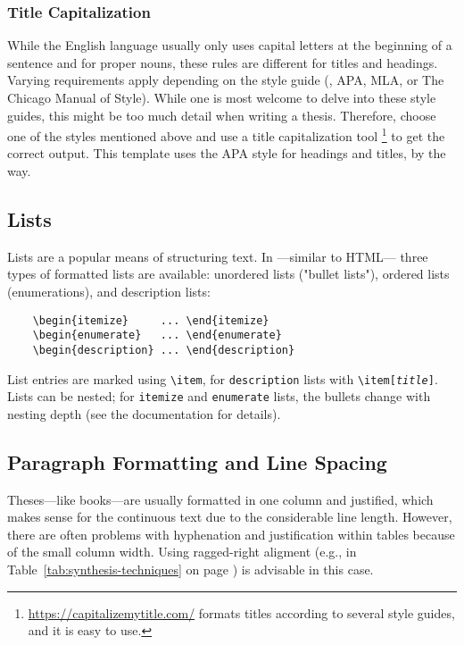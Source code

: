 \subsubsection{Title Capitalization}

While the English language usually only uses capital letters at the beginning of
a sentence and for proper nouns, these rules are different for titles and
headings. Varying requirements apply depending on the style guide (\eg, APA,
MLA, or The Chicago Manual of Style). While one is most welcome to delve into
these style guides, this might be too much detail when writing a thesis.
Therefore, choose one of the styles mentioned above and use a
title capitalization tool%
\footnote{\url{https://capitalizemytitle.com/} formats titles according to
several style guides, and it is easy to use.}
to get the correct output. This template uses the APA style for headings and
titles, by the way.

\subsection{Lists}

Lists are a popular means of structuring text. In \latex---similar to HTML---
three types of formatted lists are available: unordered lists ("bullet lists"),
ordered lists (enumerations), and description lists:
%
\begin{verbatim}
    \begin{itemize}     ... \end{itemize}
    \begin{enumerate}   ... \end{enumerate}
    \begin{description} ... \end{description}
\end{verbatim}
%
List entries are marked using \verb!\item!, for \texttt{description} lists with
\verb!\item[!\texttt{\em title}\verb!]!. Lists can be nested; for
\texttt{itemize} and \texttt{enumerate} lists, the bullets change with nesting
depth (see the \latex documentation for details).

\subsection{Paragraph Formatting and Line Spacing}

Theses---like books---are usually formatted in one column and justified, which
makes sense for the continuous text due to the considerable line length.
However, there are often problems with hyphenation and justification within
tables because of the small column width. Using ragged-right aligment (e.g., in
Table~\ref{tab:synthesis-techniques} on page \pageref{tab:synthesis-techniques})
is advisable in this case.


